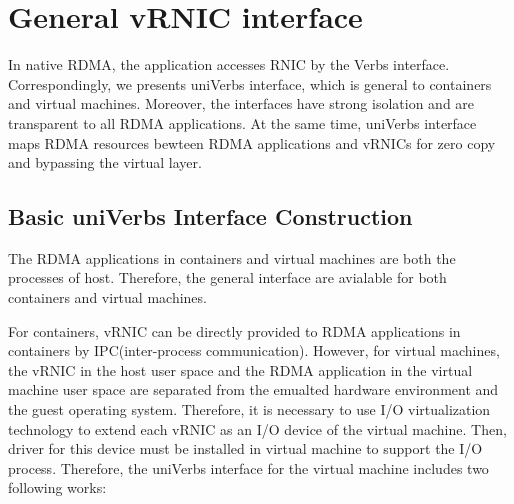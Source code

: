 
\section{General vRNIC interface}
In native RDMA, the application accesses RNIC by the Verbs interface. Correspondingly, we presents uniVerbs interface, which is general to containers and virtual machines. Moreover, the interfaces have strong isolation and are transparent to all RDMA applications. At the same time, uniVerbs interface maps RDMA resources bewteen RDMA applications and vRNICs for zero copy and bypassing the virtual layer.
	
\subsection{Basic uniVerbs Interface Construction}
The RDMA applications in containers and virtual machines are both the processes of host. Therefore, the general interface are avialable for both containers and virtual machines. 

For containers, vRNIC can be directly provided to RDMA applications in containers by IPC(inter-process communication). However, for virtual machines, the vRNIC in the host user space and the RDMA application in the virtual machine user space are separated from the emualted hardware environment and the guest operating system. Therefore, it is necessary to use I/O virtualization technology to extend each vRNIC as an I/O device of the virtual machine. Then, driver for this device must be installed in virtual machine to support the I/O process. Therefore, the uniVerbs interface for the virtual machine includes two following works:

